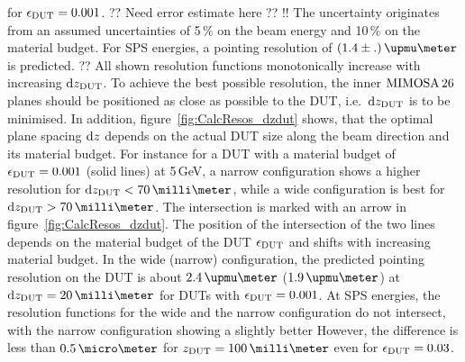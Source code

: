 \noindent
for $\mathnormal{\epsilon_{\textrm{DUT}}} = 0.001$. ?? Need error estimate here ?? !!
The uncertainty originates from an assumed uncertainties of 5\,\% on the beam energy and 10\,\% on the material budget. 
For SPS energies, a pointing resolution of $(1.4\pm . )\,\upmu\meter$ is predicted. ??
All shown resolution functions monotonically increase with increasing $\textrm{d}z_{\textrm{DUT}}$. 
To achieve the best possible resolution, the inner $\textrm{MIMOSA\,26}$ planes should be positioned as close as possible to the DUT, i.e.~$\textrm{d}z_{\textrm{DUT}}$ is to be minimised. 
In addition, figure~\ref{fig:CalcResos_dzdut} shows, that the optimal plane spacing $\textrm{d}z$ depends on the actual DUT size along the beam direction and its material budget.
For instance for a DUT with a material budget of $\mathnormal{\epsilon_{\textrm{DUT}}} = 0.001$ (solid lines) at 5\,GeV, a narrow configuration shows a higher resolution for $\dzdut < 70\,\milli\meter$,
 while a wide configuration is best for $\dzdut > 70\,\milli\meter$.
The intersection is marked with an arrow in figure~\ref{fig:CalcResos_dzdut}. 
The position of the intersection of the two lines depends on the material budget of the DUT $\mathnormal{\epsilon_{\textrm{DUT}}}$ and shifts with increasing material budget. 
In the wide (narrow) configuration, the predicted pointing resolution on the DUT is about $2.4\,\upmu\meter$ ($1.9\,\upmu\meter$) at $\dzdut = 20\,\milli\meter$ for DUTs with $\mathnormal{\epsilon_{\textrm{DUT}}} = 0.001$.
At SPS energies, the resolution functions for the wide and the narrow configuration do not intersect, with the narrow configuration showing a slightly better
However, the difference is less than $0.5\,\micro\meter$ for $\zdut = 100\,\milli\meter$ even for $\mathnormal{\epsilon_{\textrm{DUT}}} = 0.03$. 

